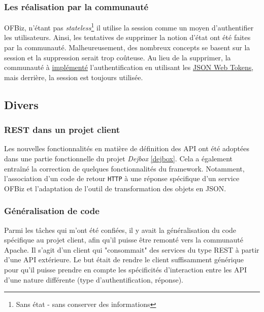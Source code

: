 \subsubsection{Les réalisation par la communauté}
OFBiz, n'étant pas \emph{stateless}\footnote{Sans état - sans conserver des informations} il utilise la session comme un moyen d'authentifier les utilisateurs. Ainsi, les tentatives de supprimer la notion d'état ont été faites par la communauté. Malheureusement, des nombreux concepts se basent sur la  session et la suppression serait trop coûteuse. Au lieu de la supprimer, la communauté à \href{https://issues.apache.org/jira/browse/OFBIZ-9833}{implémenté} l'authentification en utilisant les \href{https://jwt.io/introduction/}{JSON Web Tokens}, mais derrière, la session est toujours utilisée.
\subsection{Divers}
\subsubsection{REST dans un projet client}
Les nouvelles fonctionnalités en matière de définition des API ont été adoptées dans une partie fonctionnelle du projet \emph{Dejbox} \ref{dejbox}. Cela a également entraîné la correction de quelques fonctionnalités du framework. Notamment, l'association d'un code de retour \verb|HTTP| à une réponse spécifique d'un service OFBiz et l'adaptation de l'outil de transformation des objets en JSON.

\subsubsection{Généralisation de code}
Parmi les tâches qui m'ont été confiées, il y avait la généralisation du code spécifique au projet client, afin qu'il puisse être remonté vers la communauté Apache. Il s'agit d'un client qui "consommait" des services du type REST à partir d'une API extérieure. Le but était de rendre le client suffisamment générique pour qu'il puisse prendre en compte les spécificités d'interaction entre les API d'une nature différente (type d'authentification, réponse).



